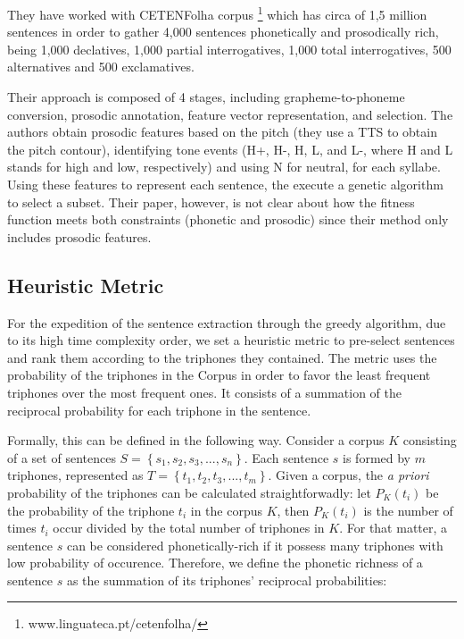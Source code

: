 They have worked with CETENFolha corpus \footnote{www.linguateca.pt/cetenfolha/} which has circa of 
1,5 million sentences in order to gather 4,000 sentences phonetically and prosodically 
rich, being 1,000 declatives, 1,000 partial interrogatives, 1,000 total interrogatives, 
500 alternatives and 500 exclamatives.   

Their approach is composed of 4 stages, including grapheme-to-phoneme conversion, 
prosodic annotation, feature vector representation, and selection. 
The authors obtain prosodic features based on the pitch (they use a TTS to obtain the pitch contour), identifying tone events (H+, H-, H, L, and L-, where H and L stands for high and low, respectively) and using N for neutral, 
for each syllabe. Using these features to represent each sentence, the execute a genetic algorithm to select a subset. Their paper, however, is not 
clear about how the fitness function meets both constraints (phonetic and prosodic) since 
their method only includes prosodic features.

\subsection{Heuristic Metric}

For the expedition of the sentence extraction through the greedy algorithm, due to its high time complexity order,
we set a heuristic metric to pre-select sentences and rank them according to the triphones they contained. The metric 
uses the probability of the triphones in  the Corpus in order to favor the least frequent triphones over the most frequent ones. 
It consists of a summation of the reciprocal probability for each triphone in the sentence.

Formally, this can be defined in the following way. Consider a corpus $K$ consisting of a set of sentences 
$S = \left \{ s_1, s_2, s_3, ..., s_n \right \}$. Each sentence $s$ is formed by $m$ triphones, represented as $T = \left \{ t_1, t_2, t_3, ..., t_m \right \}$. Given a corpus, the \emph{a priori} probability of the triphones can be calculated straightforwadly: let $P_K(t_i)$ be the probability of the triphone $t_i$ in the corpus $K$, then $P_K(t_i)$ is the number of times $t_i$ occur divided by the total number of triphones in $K$. For that matter, a sentence $s$ can be considered phonetically-rich if it possess many triphones with low probability of occurence. Therefore, we define the phonetic richness of a sentence $s$ as the summation of its triphones' reciprocal probabilities:

